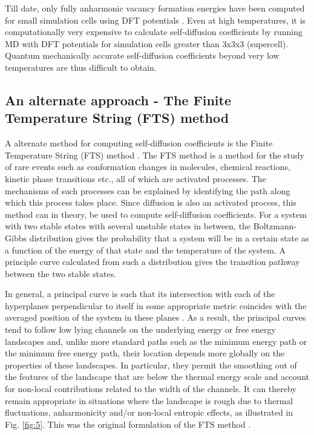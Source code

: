 \documentclass{article}
\begin{document}
Till date, only fully anharmonic vacancy formation energies have been computed for small simulation cells using DFT potentials \cite{Glensk2013}. Even at high temperatures, it is computationally very expensive to calculate self-diffusion coefficients by running MD with DFT potentials for simulation cells greater than 3x3x3 (supercell). Quantum mechanically accurate self-diffusion coefficients beyond very low temperatures are thus difficult to obtain.

\subsection{An alternate approach - The Finite Temperature String (FTS) method}

A alternate method for computing self-diffusion coefficients is the Finite Temperature String (FTS) method \cite{Vanden-Eijnden2009, Weinan2005}. The FTS method is a method for the study of rare events such as conformation changes in molecules, chemical reactions, kinetic phase transitions etc., all of which are activated processes. The mechanisms of such processes can be explained by identifying the path along which this process takes place. Since diffusion is also an activated process, this method can in theory, be used to compute self-diffusion coefficients. For a system with two stable states with several unstable states in between, the Boltzmann-Gibbs distribution gives the probability that a system will be in a certain state as a function of the energy of that state and the temperature of the system. A principle curve \cite{Hastie1989} calculated from such a distribution gives the transition pathway between the two stable states. 

In general, a principal curve is such that its intersection with each of the hyperplanes perpendicular to itself in some appropriate metric coincides with the averaged position of the system in these planes \cite{Hastie1989}. As a result, the principal curves tend to follow low lying channels on the underlying energy or free energy landscapes and, unlike more standard paths such as the minimum energy path or the minimum free energy path, their location depends more globally on the properties of these landscapes. In particular, they permit the smoothing out of the features of the landscape that are below the thermal energy scale and account for non-local contributions related to the width of the channels. It can thereby remain appropriate in situations where the landscape is rough due to thermal fluctuations, anharmonicity and/or non-local entropic effects, as illustrated in Fig. \ref{fig:5}. This was the original formulation of the FTS method \cite{Weinan2005}.
\end{document}
